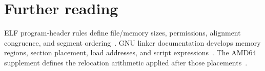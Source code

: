 \section{Further reading}
\label{sec:ch58-reading}
ELF program-header rules define file/memory sizes, permissions, alignment congruence, and segment ordering~\cite{xinuos-2026-elf}.
GNU linker documentation develops memory regions, section placement, load addresses, and script expressions~\cite{gnu-2026-ld}.
The AMD64 supplement defines the relocation arithmetic applied after those placements~\cite{matz-2012-amd64}.
